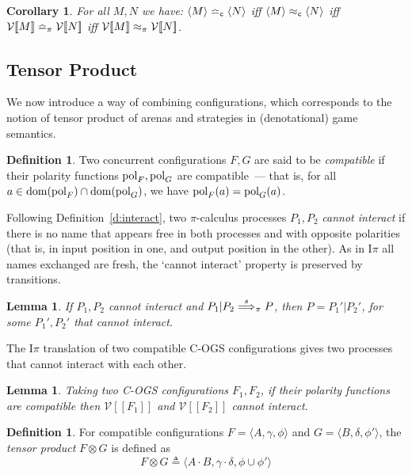 \documentclass[11pt,a4paper]{amsart}
\theoremstyle{plain}
\theoremstyle{definition}
\theoremstyle{defC}
\theoremstyle{thmC}
\theoremstyle{plain}
\numberwithin{equation}{section}
\newcommand{\trace}{s}
\newcommand{\COGS}{\mbox{{\rm C-OGS}}\xspace}      %
\newcommand{\appendSYMB}{\otimes}
\newcommand{\appendCon}[2]{#1 \otimes #2}
\newcommand{\rmm}[1]{{\tt{\lowercase{#1}}}}
\newcommand{\genArr}[2]{\mathrel{\stackrel{{#1}}{\Longrightarrow}_{\rmm{\lowercase{#2}}}}}  %
\newcommand{\ArrPI}[1]{\genArr{#1}{\pi}}   %
\newcommand{\genTE}[1]{\mathrel{\bumpeq_{\rmm{\lowercase{#1}}}}}       %
\newcommand{\genwb}[1]{\mathrel{\approx_{\rmm{\lowercase{#1}}}}}       %
\newcommand{\wbPI}{\genwb{\pi}}       %
\newcommand{\wbC}{\genwb{C}}       %
\newcommand{\TEPI}{\genTE{\pi}}       %
\newcommand{\TEp}{\genTE{C}}       %
\newcommand{\FF}{F}
\newcommand{\GG}{G}
\newcommand{\cbvSymb}{{\mathcal {V}}}
\newcommand{\encoEnvI}[1]{ \cbvSymb[\! [ #1 ] \! ]  } %
\newcommand{\encoConI}{\encoEnvI} %
\newcommand{\Intp}{\mbox{I$\pi$}\xspace}   %
\newcommand{\piI}{\Intp}   %
\newcommand{\defeq}{\mathrel{\triangleq}}
\newcommand{\dom}[1]{\mathrm{dom}(#1)}
\newcommand{\conf}[1]{\langle #1\rangle}
\newcommand{\Label}{{\rm pol}}
\theoremstyle{plain}
\newtheorem{lemma}[thm]{Lemma}
\newtheorem{corollary}[thm]{Corollary}
\theoremstyle{definition}
\newtheorem{definition}[thm]{Definition}
\begin{document}
\begin{corollary}
\label{c:fa_all}
For all $M,N$ we have: 
$\conf{M} \TEp \conf {N}$ iff 
$\conf{M} \wbC \conf {N}$ iff 
$\encoEnvI {{M} } \TEPI\encoEnvI {{N}}$
iff 
$\encoEnvI {{M}} \wbPI \encoEnvI {{N}}$. 
\end{corollary} 


\subsection{Tensor Product}
\label{ss:tp}
We now introduce a way of combining configurations, which corresponds to the notion of
tensor product of arenas and strategies in (denotational) game semantics.

\begin{definition}
Two concurrent configurations $\FF,\GG$ are said to be \emph{compatible} if 
their polarity functions  $\Label_{\FF},\Label_{\GG}$ are compatible~--- that is,
for all $a \in \dom{\Label_{\FF}} \cap \dom{\Label_{\GG}}$,
we have $\Label_{\FF}(a) = \Label_{\GG}(a)$.
\end{definition}

\noindent
Following Definition~\ref{d:interact},
two $\pi$-calculus processes $P_1,P_2$ \emph{cannot interact} 
if there is no name that appears free in both processes
and with opposite polarities 
(that is, in input position in one, 
and output position in the other). 
As
 in \piI all names exchanged are fresh, 
the  `cannot interact' property is preserved by transitions.

\begin{lemma}
  \label{l:ci_trans}
If $P_1,P_2$ cannot interact and 
$P_1 | P_2 \ArrPI \trace P $, then $P =  P_1'| P_2'$, for some 
$P_1', P_2'$ that cannot interact.
\end{lemma}
 
\noindent
The \piI translation of
two compatible \COGS configurations gives two processes that 
cannot interact with each other.

\begin{lemma}
  \label{l:compat_cannot-interact}
  Taking two \COGS configurations $\FF_1,\FF_2$,
  if their polarity functions are compatible then $\encoConI {\FF_1}$ and
  $\encoConI {\FF_2}$ cannot interact.
\end{lemma} 


\begin{definition}
  \label{d:tensor_cogs}
For  compatible configurations
$ \FF = \conf{ A , \gamma, \phi }$
and 
$ \GG = \conf{ B , \delta, \phi' }$,  the \emph{tensor product} 
$\FF \appendSYMB \GG$ is  defined as 
\[ \appendCon \FF \GG  \defeq
 \conf{ A \cdot B , \gamma \cdot \delta, \phi \cup \phi' }
 \] 
 \end{definition}
\end{document}
